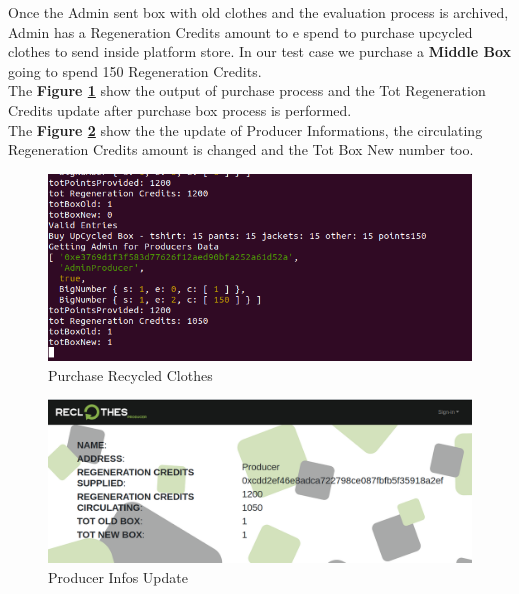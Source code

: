 Once the Admin sent box with old clothes and the evaluation process is archived, Admin has 
a Regeneration Credits amount to e spend to purchase upcycled clothes to send inside platform store.
In our test case we purchase a \textbf{Middle Box} going to spend 150 Regeneration Credits.
\\
The \textbf{Figure \ref{fig:buy-recycled-clothes}} show the output of purchase process and the 
Tot Regeneration Credits update after purchase box process is performed.
\\
The \textbf{Figure \ref{fig:producer-infos}} show the the update of Producer Informations,
the circulating Regeneration Credits amount is changed and the Tot Box New number too.

\begin{figure}[h!]
	\centering
    \includegraphics[totalheight=5cm]{img/test/usecase2/4-buy-recycled-clothes.png}
	\caption{Purchase Recycled Clothes}
	\label{fig:buy-recycled-clothes}
\end{figure}

\begin{figure}[h!]
	\centering
    \includegraphics[totalheight=5cm]{img/test/usecase2/5-producer-info-update.png}
	\caption{Producer Infos Update}
	\label{fig:producer-infos}
\end{figure}